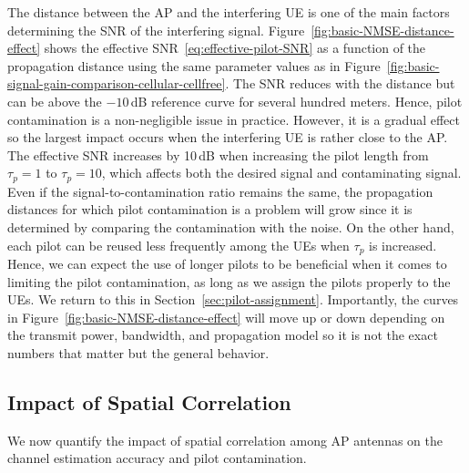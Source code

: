 The distance between the AP and the interfering UE is one of the main factors determining the SNR of the interfering signal. Figure~\ref{fig:basic-NMSE-distance-effect} shows the effective SNR~\eqref{eq:effective-pilot-SNR} as a function of the propagation distance using the same parameter values as in Figure~\ref{fig:basic-signal-gain-comparison-cellular-cellfree}.
The SNR reduces with the distance but can be above the $-10$\,dB reference curve for several hundred meters. Hence, pilot contamination is a non-negligible issue in practice. However, it is a gradual effect so the largest impact occurs when the interfering UE is rather close to the AP.
The effective SNR increases by 10\,dB when increasing the pilot length from $\tau_p=1$ to  $\tau_p=10$, which affects both the desired signal and contaminating signal. Even if the signal-to-contamination ratio remains the same, the propagation distances for which pilot contamination is a problem will grow since it is determined by comparing the contamination with the noise. On the other hand, each pilot can be reused less frequently among the UEs when  $\tau_p$ is increased. Hence, we can expect the use of longer pilots to be beneficial when it comes to limiting the pilot contamination, as long as we assign the pilots properly to the UEs. We return to this in Section~\ref{sec:pilot-assignment}.
Importantly, the curves in Figure~\ref{fig:basic-NMSE-distance-effect} will move up or down depending on the transmit power, bandwidth, and propagation model so it is not the exact numbers that matter but the general behavior.

\enlargethispage{\baselineskip}

\subsection{Impact of Spatial Correlation}
\label{sec:impact-of-spatial-correlation}
We now quantify the impact of spatial correlation among AP antennas on the channel estimation accuracy and pilot contamination. 


